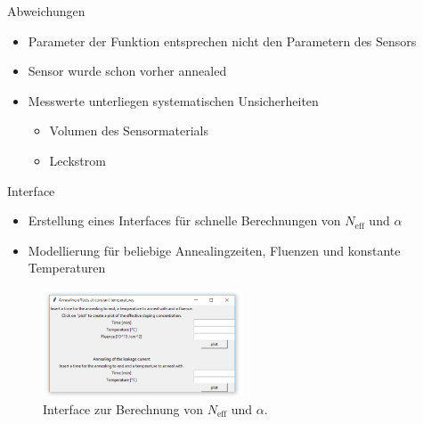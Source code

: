 \documentclass[aspectratio=1610, 9pt]{beamer}
\begin{document}
\begin{frame}{Abweichungen}
  \begin{itemize}
    \item Parameter der Funktion entsprechen nicht den Parametern des Sensors
    \medskip
    \item Sensor wurde schon vorher annealed
    \medskip
    \item Messwerte unterliegen systematischen Unsicherheiten
    \medskip
    \begin{itemize}
      \item Volumen des Sensormaterials
      \medskip
      \item Leckstrom
    \end{itemize}
  \end{itemize}
\end{frame}

\begin{frame}{Interface}
  \begin{itemize}
    \item Erstellung eines Interfaces für schnelle Berechnungen von $N_{\mathrm{eff}}$ und $\alpha$
    \item Modellierung für beliebige Annealingzeiten, Fluenzen und konstante Temperaturen
  \end{itemize}
  \begin{figure}
      \includegraphics[width=0.53\textwidth]{images/interface.PNG}
  \caption{Interface zur Berechnung von $N_{\mathrm{eff}}$ und $\alpha$.}
  \end{figure}
\end{frame}
\end{document}
